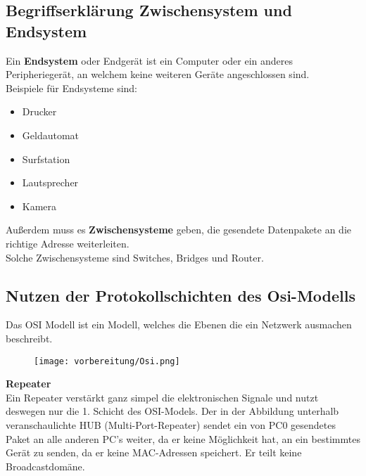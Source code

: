 \subsection{Begriffserklärung Zwischensystem und Endsystem}

    Ein \textbf{Endsystem} oder Endgerät ist ein Computer oder ein anderes Peripheriegerät, an welchem keine weiteren Geräte angeschlossen sind. \\
    Beispiele für Endsysteme sind:
    \begin{itemize}
        \item Drucker
        \item Geldautomat
        \item Surfstation
        \item Lautsprecher
        \item Kamera
    \end{itemize}
    \vspace{0cm}
    Außerdem muss es \textbf{Zwischensysteme} geben, die gesendete Datenpakete an die richtige Adresse weiterleiten. \\
    Solche Zwischensysteme sind Switches, Bridges und Router. 


\subsection{Nutzen der Protokollschichten des Osi-Modells}

    Das OSI Modell ist ein Modell, welches die Ebenen die ein Netzwerk ausmachen beschreibt.

    

    \begin{figure}[H]
        \centering
        \texttt{[image: vorbereitung/Osi.png]}
    \end{figure}
    \vspace{0cm}
    \textbf{Repeater}
    \\
    Ein Repeater verstärkt ganz simpel die elektronischen Signale und nutzt deswegen nur die 1. Schicht des OSI-Models. Der in der Abbildung unterhalb veranschaulichte HUB (Multi-Port-Repeater) sendet ein von PC0 gesendetes Paket an alle anderen PC’s weiter, da er keine Möglichkeit hat, an ein bestimmtes Gerät zu senden, da er keine MAC-Adressen speichert. Er teilt keine Broadcastdomäne.\\

